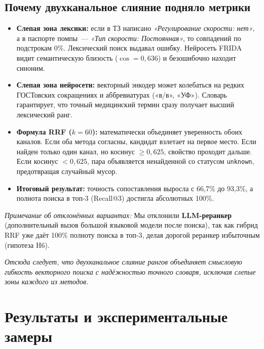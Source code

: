 \documentclass[10pt,a4paper]{article}
\begin{document}
\subsection*{Почему двухканальное слияние подняло метрики}
\begin{itemize}[leftmargin=1.2em, itemsep=0.35em]
  \item \textbf{Слепая зона лексики:} если в ТЗ написано \emph{«Регулирование скорости: нет»}, а в паспорте помпы~--- \emph{«Тип скорости: Постоянная»}, то совпадений по подстрокам 0\%. Лексический поиск выдавал ошибку. Нейросеть FRIDA видит семантическую близость ($\cos = 0{,}636$) и безошибочно находит синоним.
  \item \textbf{Слепая зона нейросети:} векторный энкодер может колебаться на редких ГОСТовских сокращениях и аббревиатурах («в/в», «УФ»). Словарь гарантирует, что точный медицинский термин сразу получает высший лексический ранг.
  \item \textbf{Формула RRF ($k = 60$):} математически объединяет уверенность обоих каналов. Если оба метода согласны, кандидат взлетает на первое место. Если найден только один канал, но косинус $\ge 0{,}625$, свойство проходит дальше. Если косинус $< 0{,}625$, пара объявляется ненайденной со статусом \texttt{unknown}, предотвращая случайный мусор.
  \item \textbf{Итоговый результат:} точность сопоставления выросла с 66,7\% до 93,3\%, а полнота поиска в топ-3 (Recall@3) достигла абсолютных 100\%.
\end{itemize}

\vspace{0.15em}
\emph{Примечание об отклонённых вариантах:} Мы отклонили \textbf{LLM-реранкер} (дополнительный вызов большой языковой модели после поиска), так как гибрид RRF уже даёт 100\% полноту поиска в топ-3, делая дорогой реранкер избыточным (гипотеза H6).

\vspace{0.25em}
\emph{Отсюда следует, что двухканальное слияние рангов объединяет смысловую гибкость векторного поиска с надёжностью точного словаря, исключая слепые зоны каждого из методов.}

\newpage
\section{Результаты и экспериментальные замеры}
\end{document}
